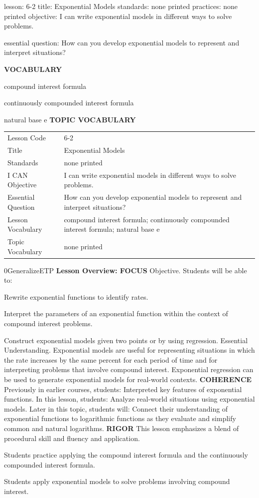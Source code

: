 \documentclass{article}
\newenvironment{lesson-meta}{}{}        %
\newenvironment{te-addendum}[2]{}{}     %
\newcommand{\te}[1]{}                   %
\begin{document}
\begin{lesson-meta}
lesson: 6-2
title: Exponential Models
standards: none printed
practices: none printed
objective: I can write exponential models in different ways to solve problems.

essential question: How can you develop exponential models to represent and interpret situations?

\textbf{VOCABULARY}
\item compound interest formula
\item continuously compounded interest formula
\item natural base e
\textbf{TOPIC VOCABULARY}
\te{No separate topic vocabulary list is printed on these lesson pages.}
\begin{tabular}{ll}
Lesson Code & 6-2 \\
Title & Exponential Models \\
Standards & none printed \\
I CAN Objective & I can write exponential models in different ways to solve problems. \\
Essential Question & How can you develop exponential models to represent and interpret situations? \\
Lesson Vocabulary & compound interest formula; continuously compounded interest formula; natural base e \\
Topic Vocabulary & none printed \\
\end{tabular}
\end{lesson-meta}
\begin{te-addendum}{0}{GeneralizeETP}
\textbf{Lesson Overview: FOCUS}
Objective. Students will be able to:
\item Rewrite exponential functions to identify rates.
\item Interpret the parameters of an exponential function within the context of compound interest problems.
\item Construct exponential models given two points or by using regression.
Essential Understanding. Exponential models are useful for representing situations in which the rate increases by the same percent for each period of time and for interpreting problems that involve compound interest. Exponential regression can be used to generate exponential models for real-world contexts.
\textbf{COHERENCE}
Previously in earlier courses, students: Interpreted key features of exponential functions.
In this lesson, students: Analyze real-world situations using exponential models.
Later in this topic, students will: Connect their understanding of exponential functions to logarithmic functions as they evaluate and simplify common and natural logarithms.
\textbf{RIGOR}
This lesson emphasizes a blend of procedural skill and fluency and application.
\item Students practice applying the compound interest formula and the continuously compounded interest formula.
\item Students apply exponential models to solve problems involving compound interest.
\end{te-addendum}
\end{document}
